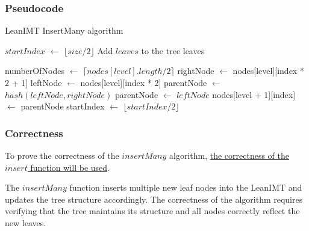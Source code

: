 \documentclass{article}
\begin{document}
\subsubsection{Pseudocode}

\begin{algorithm}[H]
    \caption{LeanIMT InsertMany algorithm}\label{insertMany}
    \begin{algorithmic}[1]
        \State $startIndex$ $\gets$ $\lfloor size/2 \rfloor$ 
        \State Add $leaves$ to the tree leaves

        \State numberOfNodes $\gets$ $\lceil nodes[level].length / 2 \rceil$ 
        \State rightNode $\gets$ nodes[level][index * 2 + 1] 
        \State leftNode $\gets$ nodes[level][index * 2] 
        \State parentNode $\gets$ $hash(leftNode, rightNode)$
        \Else
        \State parentNode $\gets$ $leftNode$
        \EndIf
        \State nodes[level + 1][index] $\gets$ parentNode 
        \EndFor
        \State startIndex $\gets$ $\lfloor startIndex/2 \rfloor$ 
        \EndFor
        \EndProcedure
    \end{algorithmic}
\end{algorithm}



\subsubsection{Correctness}

To prove the correctness of the $insertMany$ algorithm, \hyperref[sec:insert-correctness]{the correctness of the $insert$ function will be used}.

The $insertMany$ function inserts multiple new leaf nodes into the LeanIMT and updates the tree structure accordingly. The correctness of the algorithm requires verifying that the tree maintains its structure and all nodes correctly reflect the new leaves.
\end{document}
